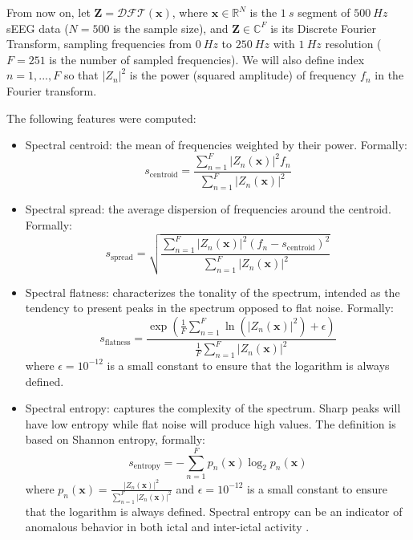 From now on, let $\mathbf{Z}=\mathcal{DFT}(\mathbf{x})$, where
$\mathbf{x}\in\mathbb{R}^N$ is the $1\ s$ segment of $500\ Hz$ sEEG
data ($N=500$ is the sample size), and $\mathbf{Z}\in\mathbb{C}^F$ is its
Discrete Fourier Transform, sampling frequencies from $0\ Hz$ to $250\ Hz$ with 
$1\ Hz$ resolution ($F=251$ is the number of sampled frequencies).
We will also define index $n=1,...,F$ so that $|Z_n|^2$ is the power 
(squared amplitude) of frequency $f_n$ in the Fourier transform.

The following features were computed:
\begin{itemize}
    \item Spectral centroid: the mean of frequencies weighted by their power.
    Formally:
    \begin{equation}
        s_\text{centroid} = \frac
        {\sum_{n=1}^F{|Z_n(\mathbf{x})|^2f_n}}
        {\sum_{n=1}^F{|Z_n(\mathbf{x})|^2}}
    \end{equation}
    
    \item Spectral spread: the average dispersion of frequencies around the
    centroid. Formally:
    \begin{equation}
        s_\text{spread} = \sqrt{\frac
        {\sum_{n=1}^F{|Z_n(\mathbf{x})|^2(f_n-s_\text{centroid})^2}}
        {\sum_{n=1}^F{|Z_n(\mathbf{x})|^2}}}
    \end{equation}
     
    \item Spectral flatness: characterizes the tonality of the spectrum,
    intended as the tendency to present peaks in the spectrum opposed to flat
    noise. Formally:
    \begin{equation}
        s_\text{flatness}=
        \frac{\exp\left(\frac{1}{F}\sum_{n=1}^F\ln
        \left(|Z_n(\mathbf{x})|^2\right)+\epsilon\right)}
        {\frac{1}{F}\sum_{n=1}^F|Z_n(\mathbf{x})|^2}
    \end{equation}
    where $\epsilon=10^{-12}$ is a small constant to ensure that the logarithm
    is always defined. 
    
    \item Spectral entropy: captures the complexity of the spectrum.
    Sharp peaks will have low entropy while flat noise will produce high values.
    The definition is based on Shannon entropy, formally:
    \begin{equation}
        s_\text{entropy}=
        -\sum_{n=1}^F{p_n(\mathbf{x})\log_2{p_n(\mathbf{x})}}
    \end{equation}    
    where $p_n(\mathbf{x})=\frac{|Z_n(\mathbf{x})|^2} 
    {\sum_{n=1}^F|Z_n(\mathbf{x})|^2}$ and $\epsilon=10^{-12}$ is a small
    constant to ensure that the logarithm is always defined.
    Spectral entropy can be an indicator of anomalous behavior in both ictal
    and inter-ictal activity \cite{spectral-entropy}.
    

\end{itemize}
